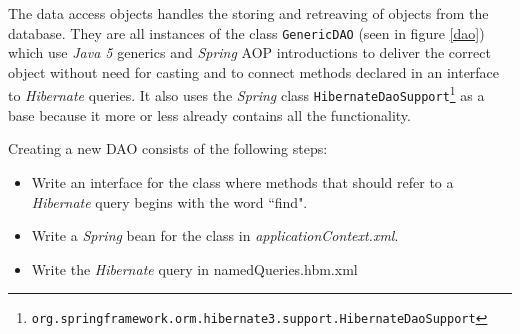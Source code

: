 \documentclass[a4paper,10pt]{article}
\begin{document}
	\begin{multicols}{2}
        \noindent The data access objects handles the storing and retreaving of
        objects from the database. They are all instances of the class
        \texttt{GenericDAO} (seen in figure \ref{dao}) which use \textsl{Java
        5} generics and \textsl{Spring} AOP introductions to deliver the
        correct object without need for casting and to connect methods declared
        in an interface to \textsl{Hibernate} queries. It also uses the
        \textsl{Spring} class \texttt{HibernateDaoSupport}\footnote{
        \texttt{org.springframework.orm.hibernate3.support.HibernateDaoSupport}}
        as a base because it more or less already contains all the
        functionality.
	    
        Creating a new DAO consists of the following steps:
	    
        \begin{itemize} 
            \item Write an interface for the class where methods
                  that should refer to a \textsl{Hibernate} query begins with
                  the word ``find".  
            \item Write a \textsl{Spring} bean for the class in 
                  \textit{applicationContext.xml}.  
            \item Write the \textsl{Hibernate} query in namedQueries.hbm.xml
        \end{itemize}
    \end{multicols}
\end{document}
